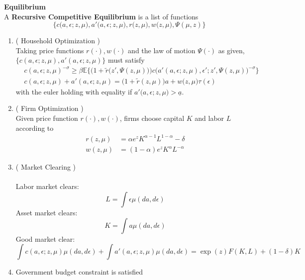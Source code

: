 \documentclass[a4paper,11pt]{article}  %
\begin{document}
\textbf{Equilibrium} \\
A \textbf{Recursive Competitive Equilibrium} is a list of functions
\[
   \Big\{
   c\big( a,\epsilon ; z, \mu \big) ,a'\big( a,\epsilon ; z, \mu \big),
   r\big( z,\mu \big), w\big( z,\mu \big),
   \Psi (\mu,z)
   \Big\}
\]
\begin{enumerate}
   \item ( Household Optimization ) \\
         Taking price functions $ r(\cdot), w( \cdot ) $ and the law of motion $\Psi(\cdot)$ as given,
         $ \Big\{ c( a,\epsilon; z, \mu ) , a'( a,\epsilon ; z, \mu ) \Big\}$ must satisfy
         \begin{align}
              & c( a, \epsilon ; z,\mu )^{ - \sigma } \ge
            \beta \mathbb{E} \bigg\{
            \Big( 1+ \tilde{r} \Big( z', \Psi( z, \mu ) \Big) \Big) c\Big( a'( a, \epsilon; z, \mu ),
            \epsilon'; z', \Psi( z,\mu ) \Big)^{- \sigma}
            \bigg\} \label{eq:euler} \\
              & c( a, \epsilon ; z,\mu ) + a'( a,\epsilon; z, \mu ) = \big( 1 + \tilde{r}(z, \mu ) \big)
            a + w \big( z, \mu \big) \tau( \epsilon )  \label{eq:budget_constraint}
         \end{align}
         with the euler holding with equality if $ a'\big( a, \epsilon; z , \mu \big) > \underline{a} $.

   \item ( Firm Optimization ) \\
         Given price function $ r( \cdot ) , w ( \cdot ) $, firms choose capital $K$ and labor $L$ according to
         \begin{align}
            r( z, \mu ) & = \alpha e^{z} K^{ \alpha-1 } L^{ 1- \alpha } - \delta \\
            w( z, \mu ) & = ( 1- \alpha ) e^{z} K^{ \alpha } L^{ - \alpha }
         \end{align}

   \item ( Market Clearing ) \\~\\
         Labor market clears:
         \begin{equation}
            \label{eq:labor_mkt}
            L = \int \epsilon \mu( da, d\epsilon )
         \end{equation}
         Asset market clears:
         \begin{equation}
            \label{eq:asset_mkt}
            K = \int a \mu( da, d \epsilon )
         \end{equation}
         Good market clear:
         \begin{equation}
            \label{eq:asset_mkt}
            \int c( a, \epsilon ; z, \mu) \mu( da, d \epsilon ) + \int a'( a,\epsilon ; z, \mu) \mu( da, d \epsilon )
            = \exp{( z )} F( K,L ) + ( 1- \delta ) K
         \end{equation}
   \item Government budget constraint is satisfied


\end{enumerate}
\end{document}
